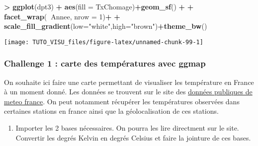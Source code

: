 \documentclass[]{article}
\newenvironment{Shaded}{\begin{snugshade}}{\end{snugshade}}
\newcommand{\DataTypeTok}[1]{\textcolor[rgb]{0.13,0.29,0.53}{#1}}
\newcommand{\DecValTok}[1]{\textcolor[rgb]{0.00,0.00,0.81}{#1}}
\newcommand{\KeywordTok}[1]{\textcolor[rgb]{0.13,0.29,0.53}{\textbf{#1}}}
\newcommand{\NormalTok}[1]{#1}
\newcommand{\OperatorTok}[1]{\textcolor[rgb]{0.81,0.36,0.00}{\textbf{#1}}}
\newcommand{\StringTok}[1]{\textcolor[rgb]{0.31,0.60,0.02}{#1}}
\providecommand{\tightlist}{%
  \setlength{\itemsep}{0pt}\setlength{\parskip}{0pt}}
\theoremstyle{definition}
\theoremstyle{definition}
\theoremstyle{definition}
\theoremstyle{remark}
\begin{document}
\begin{Shaded}
\begin{Highlighting}[]
\OperatorTok{>}\StringTok{ }\KeywordTok{ggplot}\NormalTok{(dpt3) }\OperatorTok{+}\StringTok{ }\KeywordTok{aes}\NormalTok{(}\DataTypeTok{fill =}\NormalTok{ TxChomage)}\OperatorTok{+}\KeywordTok{geom_sf}\NormalTok{() }\OperatorTok{+}
\OperatorTok{+}\StringTok{   }\KeywordTok{facet_wrap}\NormalTok{(}\OperatorTok{~}\NormalTok{Annee, }\DataTypeTok{nrow =} \DecValTok{1}\NormalTok{)}\OperatorTok{+}
\OperatorTok{+}\StringTok{   }\KeywordTok{scale_fill_gradient}\NormalTok{(}\DataTypeTok{low=}\StringTok{"white"}\NormalTok{,}\DataTypeTok{high=}\StringTok{"brown"}\NormalTok{)}\OperatorTok{+}\KeywordTok{theme_bw}\NormalTok{()}
\end{Highlighting}
\end{Shaded}

\begin{center}\texttt{[image: TUTO\_VISU\_files/figure-latex/unnamed-chunk-99-1]} \end{center}

\hypertarget{challenge1}{%
\subsubsection{Challenge 1 : carte des températures avec ggmap}\label{challenge1}}

On souhaite ici faire une carte permettant de visualiser les température en France à un moment donné. Les données se trouvent sur le site des \href{https://donneespubliques.meteofrance.fr/?fond=produit\&id_produit=90\&id_rubrique=32}{données publiques de meteo france}. On peut notamment récupérer les températures observées dans certaines stations en france ainsi que la géolocalisation de ces stations.

\begin{enumerate}
\def\labelenumi{\arabic{enumi}.}
\tightlist
\item
  Importer les 2 bases nécessaires. On pourra les lire directment sur le site. Convertir les degrés Kelvin en degrés Celsius et faire la jointure de ces bases.
\end{enumerate}
\end{document}
